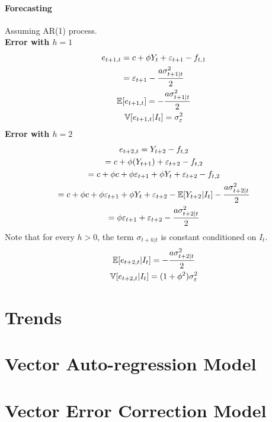 \documentclass[11pt]{article}
\begin{document}
\begin{example}
				\paragraph{Forecasting} Assuming AR(1) process. \\
				\textbf{Error with $h=1$}
					\begin{gather}
						e_{t+1, t} = c + \phi Y_t + \varepsilon_{t+1} - f_{t,1} \\
						= \varepsilon_{t+1} -\frac{a \sigma_{t+1|t}^2}{2} \\
						\mathbb{E}[{e_{t+1, t}}] = - \frac{a \sigma_{t+1|t}^2}{2} \\
						\mathbb{V}[{e_{t+1,t}|I_t}] = \sigma_\varepsilon^2
					\end{gather}
				\textbf{Error with $h=2$}
					\begin{gather}
						e_{t+2, t} = Y_{t+2} - f_{t, 2} \\
						= c + \phi(Y_{t+1}) + \varepsilon_{t+2} - f_{t,2} \\
						= c + \phi c + \phi \varepsilon_{t+1} + \phi Y_t + \varepsilon_{t+2} - f_{t,2} \\
						= c + \phi c + \phi \varepsilon_{t+1} + \phi Y_t + \varepsilon_{t+2} - \mathbb{E}[{Y_{t+2}|I_t}] - \frac{a \sigma_{t+2|t}^2}{2} \\
						= \phi \varepsilon_{t+1} + \varepsilon_{t+2} -  \frac{a \sigma_{t+2|t}^2}{2}
					\end{gather}
					Note that for every $h > 0$, the term $\sigma_{t+h|t}$ is constant conditioned on $I_t$.
					\begin{gather}
						\mathbb{E}[{e_{t+2,t}|I_t}] = - \frac{a \sigma_{t+2|t}^2}{2} \\
						\mathbb{V}[{e_{t+2,t}|I_t}] = (1 + \phi^2) \sigma_\varepsilon^2
					\end{gather}
			\end{example}
	
	\section{Trends}
	
	\section{Vector Auto-regression Model}
	
	\section{Vector Error Correction Model}
			
\end{document}
